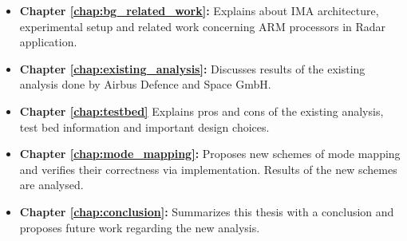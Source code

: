 \begin{itemize}
	\item \textbf{Chapter \ref{chap:bg_related_work}:} Explains about IMA architecture, experimental setup and related work concerning ARM processors in Radar application.

	\item \textbf{Chapter \ref{chap:existing_analysis}:} Discusses results of the existing analysis done by Airbus Defence and Space GmbH.

	\item \textbf{Chapter \ref{chap:testbed}} Explains pros and cons of the existing analysis, test bed information and important design choices.

	\item \textbf{Chapter \ref{chap:mode_mapping}:}  Proposes new schemes of mode mapping and verifies their correctness via implementation. Results of the new schemes are analysed.

	\item \textbf{Chapter \ref{chap:conclusion}:} Summarizes this thesis with a conclusion and proposes future work regarding the new analysis.
\end{itemize}
%


